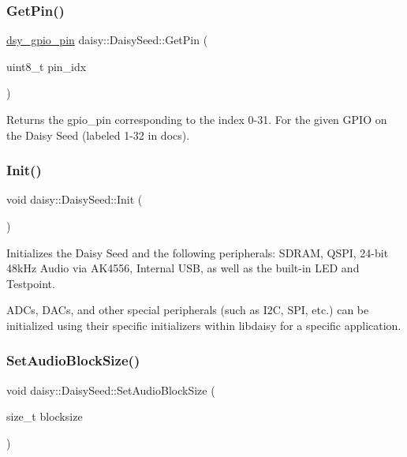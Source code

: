 \begin{DoxyCompactItemize}
\subsubsection{\texorpdfstring{Get\+Pin()}{GetPin()}}
{\footnotesize\ttfamily \hyperlink{structdsy__gpio__pin}{dsy\+\_\+gpio\+\_\+pin} daisy\+::\+Daisy\+Seed\+::\+Get\+Pin (\begin{DoxyParamCaption}\item[{uint8\+\_\+t}]{pin\+\_\+idx }\end{DoxyParamCaption})}

Returns the gpio\+\_\+pin corresponding to the index 0-\/31. For the given G\+P\+IO on the Daisy Seed (labeled 1-\/32 in docs). \mbox{\label{classdaisy_1_1_daisy_seed_a7b122b78cb745b1e1bedfca9de8b2ad4}} 
\subsubsection{\texorpdfstring{Init()}{Init()}}
{\footnotesize\ttfamily void daisy\+::\+Daisy\+Seed\+::\+Init (\begin{DoxyParamCaption}{ }\end{DoxyParamCaption})}

Initializes the Daisy Seed and the following peripherals\+: S\+D\+R\+AM, Q\+S\+PI, 24-\/bit 48k\+Hz Audio via A\+K4556, Internal U\+SB, as well as the built-\/in L\+ED and Testpoint.

A\+D\+Cs, D\+A\+Cs, and other special peripherals (such as I2C, S\+PI, etc.) can be initialized using their specific initializers within libdaisy for a specific application. \mbox{\label{classdaisy_1_1_daisy_seed_a4209c18a3c181e8427ebc7639d4170b6}} 
\subsubsection{\texorpdfstring{Set\+Audio\+Block\+Size()}{SetAudioBlockSize()}}
{\footnotesize\ttfamily void daisy\+::\+Daisy\+Seed\+::\+Set\+Audio\+Block\+Size (\begin{DoxyParamCaption}\item[{size\+\_\+t}]{blocksize }\end{DoxyParamCaption})}


\end{DoxyCompactItemize}

